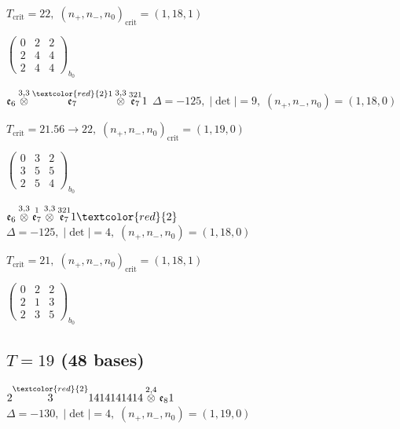 \documentclass[10pt]{article}
\begin{document}
\hspace{1em}$T_{\text{crit}}=22,\; (n_+,n_-,n_0)_{\text{crit}}=(1,18,1)$

\hspace{2em}$\left(\begin{smallmatrix}0 & 2 & 2 \\ 2 & 4 & 4 \\ 2 & 4 & 4\end{smallmatrix}\right)_{\!b_0}$

\smallskip

$\mathfrak{e}_6\overset{3,3}{\otimes}\overset{\textcolor{red}{2}1}{\mathfrak{e}_7}\overset{3,3}{\otimes}\overset{321}{\mathfrak{e}_7}1$ \quad $\Delta=-125,\; |\det|=9,\; (n_+,n_-,n_0)=(1,18,0)$

\hspace{1em}$T_{\text{crit}}=21.56 \to 22,\; (n_+,n_-,n_0)_{\text{crit}}=(1,19,0)$

\hspace{2em}$\left(\begin{smallmatrix}0 & 3 & 2 \\ 3 & 5 & 5 \\ 2 & 5 & 4\end{smallmatrix}\right)_{\!b_0}$

$\mathfrak{e}_6\overset{3,3}{\otimes}\overset{1}{\mathfrak{e}_7}\overset{3,3}{\otimes}\overset{321}{\mathfrak{e}_7}1\textcolor{red}{2}$ \quad $\Delta=-125,\; |\det|=4,\; (n_+,n_-,n_0)=(1,18,0)$

\hspace{1em}$T_{\text{crit}}=21,\; (n_+,n_-,n_0)_{\text{crit}}=(1,18,1)$

\hspace{2em}$\left(\begin{smallmatrix}0 & 2 & 2 \\ 2 & 1 & 3 \\ 2 & 3 & 5\end{smallmatrix}\right)_{\!b_0}$


\subsection*{$T = 19$ \quad (48 bases)}
\smallskip

$2\overset{\textcolor{red}{2}}{3}1414141414\overset{2,4}{\otimes}\mathfrak{e}_81$ \quad $\Delta=-130,\; |\det|=4,\; (n_+,n_-,n_0)=(1,19,0)$
\end{document}

